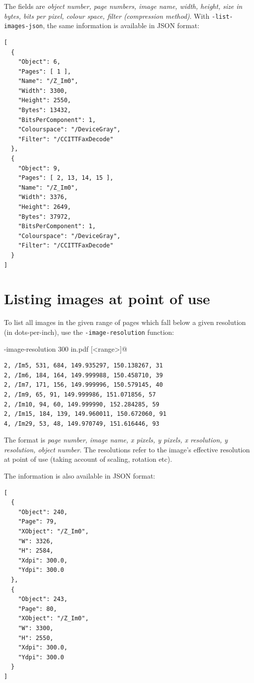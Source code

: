 \documentclass{book}
\begin{document}
\noindent The fields are \textit{object number, page numbers, image name, width, height, size in bytes, bits per pixel, colour space, filter (compression method)}. With \texttt{-list-images-json}, the same information is available in JSON format:

  \begin{framed}
{\small\begin{verbatim}[
  {
    "Object": 6,
    "Pages": [ 1 ],
    "Name": "/Z_Im0",
    "Width": 3300,
    "Height": 2550,
    "Bytes": 13432,
    "BitsPerComponent": 1,
    "Colourspace": "/DeviceGray",
    "Filter": "/CCITTFaxDecode"
  },
  {
    "Object": 9,
    "Pages": [ 2, 13, 14, 15 ],
    "Name": "/Z_Im0",
    "Width": 3376,
    "Height": 2649,
    "Bytes": 37972,
    "BitsPerComponent": 1,
    "Colourspace": "/DeviceGray",
    "Filter": "/CCITTFaxDecode"
  }
]\end{verbatim}}
  \end{framed}

  \section{Listing images at point of use}\label{imageres}
  To list all images in the given range of pages which fall below a given resolution (in dots-per-inch), use the \verb!-image-resolution! function:
  \begin{framed}
  \noindent\small\verb@cpdf -image-resolution 300 in.pdf [<range>]@
  \end{framed}

  \begin{framed}
{\small\begin{verbatim}2, /Im5, 531, 684, 149.935297, 150.138267, 31
2, /Im6, 184, 164, 149.999988, 150.458710, 39
2, /Im7, 171, 156, 149.999996, 150.579145, 40
2, /Im9, 65, 91, 149.999986, 151.071856, 57
2, /Im10, 94, 60, 149.999990, 152.284285, 59
2, /Im15, 184, 139, 149.960011, 150.672060, 91
4, /Im29, 53, 48, 149.970749, 151.616446, 93\end{verbatim}}
  \end{framed}
  \noindent The format is \textit{page number, image name, x pixels, y pixels, x resolution, y resolution, object number}. The resolutions refer to the image's effective resolution at point of use (taking account 
of scaling, rotation etc).

The information is also available in JSON format:
\begin{framed}
{\small\begin{verbatim}
[
  {
    "Object": 240,
    "Page": 79,
    "XObject": "/Z_Im0",
    "W": 3326,
    "H": 2584,
    "Xdpi": 300.0,
    "Ydpi": 300.0
  },
  {
    "Object": 243,
    "Page": 80,
    "XObject": "/Z_Im0",
    "W": 3300,
    "H": 2550,
    "Xdpi": 300.0,
    "Ydpi": 300.0
  }
]
\end{verbatim}}
  \end{framed}
\end{document}

